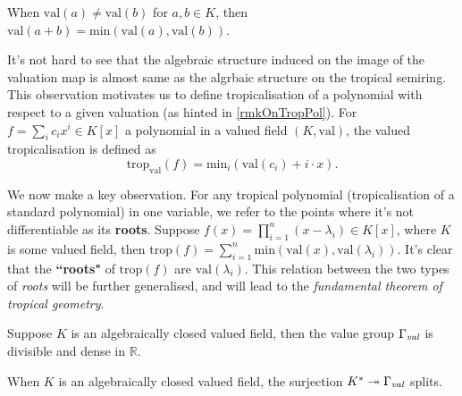     \begin{lemma}
        \label{vallemma}
        When $\text{val}(a) \neq \text{val}(b)$ for $a,b \in K$, then $\text{val}(a+b)= \text{min}(\text{val}(a),\text{val}(b))$.
    \end{lemma}
    It's not hard to see that the algebraic structure induced on the image of the valuation map is almost same as the algrbaic structure on the tropical semiring. 
    This observation motivates us to define tropicalisation of a polynomial with respect to a given valuation (as hinted in \ref{rmkOnTropPol}).
    For $f = \sum_{i}c_{i}x^{i} \in K[x]$ a polynomial in a valued field $(K, \text{val})$, the valued tropicalisation is defined as
    \begin{equation*}
        \text{trop}_{\text{val}}(f) = \text{min}_{i}(\text{val}(c_{i}) + i \cdot x).
    \end{equation*}
    \begin{remark}
        \label{rootValRmk}
    We now make a key observation. For any tropical polynomial (tropicalisation of a standard polynomial) in one variable, we refer to the points where it's not differentiable as its \textbf{roots}. 
    Suppose $f(x) = \prod_{i=1}^{n}(x-\lambda_i) \in K[x]$, where $K$ is some valued field, then $\text{trop}(f) = \sum_{i=1}^{n}\text{min}(\text{val}(x),\text{val}(\lambda_i))$. 
    It's clear that the \textbf{``roots"} of $\text{trop}(f)$ are $\text{val}(\lambda_i)$.
    This relation between the two types of \textit{roots} will be further generalised, and will lead to the \textit{fundamental theorem of tropical geometry}.
    \end{remark}

    \begin{lemma}
        Suppose $K$ is an algebraically closed valued field, then the value group $\Gamma_{\emph{val}}$ is divisible and dense in $\mathbb{R}$.
    \end{lemma}

    \begin{lemma}
        When $K$ is an algebraically closed valued field, the surjection $K^{*} \twoheadrightarrow \Gamma_{\emph{val}}$ splits.
    \end{lemma}

